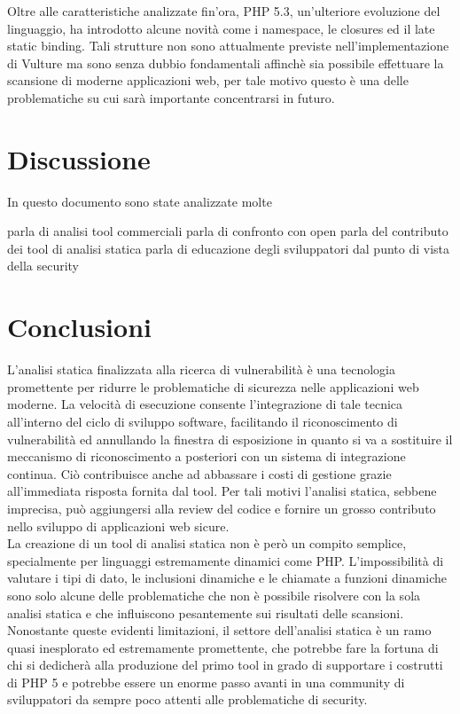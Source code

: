 Oltre alle caratteristiche analizzate fin'ora, PHP 5.3, un'ulteriore evoluzione del linguaggio, ha introdotto alcune novità come i namespace, le closures ed il late static binding. Tali strutture non sono attualmente previste nell'implementazione di Vulture ma sono senza dubbio fondamentali affinchè sia possibile effettuare la scansione di moderne applicazioni web, per tale motivo questo è una delle problematiche su cui sarà importante concentrarsi in futuro.

\chapter{Discussione}
In questo documento sono state analizzate molte

parla di analisi tool commerciali
parla di confronto con open 
parla del contributo dei tool di analisi statica
parla di educazione degli sviluppatori dal punto di vista della security

\chapter{Conclusioni}
L'analisi statica finalizzata alla ricerca di vulnerabilità è una tecnologia promettente per ridurre le problematiche di sicurezza nelle applicazioni web moderne. La velocità di esecuzione consente l'integrazione di tale tecnica all'interno del ciclo di sviluppo software, facilitando il riconoscimento di vulnerabilità ed annullando la finestra di esposizione in quanto si va a sostituire il meccanismo di riconoscimento a posteriori con un sistema di integrazione continua. Ciò contribuisce anche ad abbassare i costi di gestione grazie all'immediata risposta fornita dal tool.
Per tali motivi l'analisi statica, sebbene imprecisa, può aggiungersi alla review del codice e fornire un grosso contributo nello sviluppo di applicazioni web sicure.\\
La creazione di un tool di analisi statica non è però un compito semplice, specialmente per linguaggi estremamente dinamici come PHP. L'impossibilità di valutare i tipi di dato, le inclusioni dinamiche e le chiamate a funzioni dinamiche sono solo alcune delle problematiche che non è possibile risolvere con la sola analisi statica e che influiscono pesantemente sui risultati delle scansioni.\\
Nonostante queste evidenti limitazioni, il settore dell'analisi statica è un ramo quasi inesplorato ed estremamente promettente, che potrebbe fare la fortuna di chi si dedicherà alla produzione del primo tool in grado di supportare i costrutti di PHP 5 e potrebbe essere un enorme passo avanti in una community di sviluppatori da sempre poco attenti alle problematiche di security.